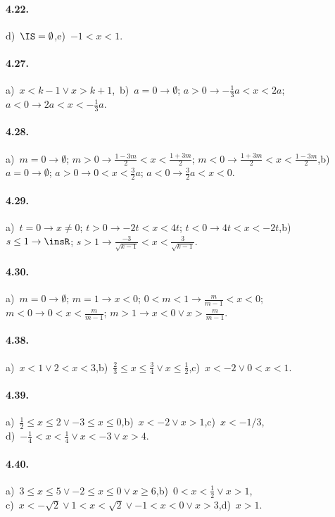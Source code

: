 \paragraph{4.22.} d)~$\IS=\emptyset $,\quad e)~$-1<x<1$.

\paragraph{4.27.} a)~$x<k-1\vee x>k+1$,\, b)~$a=0\to \emptyset$; $a>0\to -\frac 1 3a<x<2a$; $a<0\to 2a<x<-\frac 1 3a$.

\paragraph{4.28.} a)~$m=0\to \emptyset$; $m>0\to \frac{1-3m}2<x<\frac{1+3m} 2$; $m<0\to \frac{1+3m} 2<x<\frac{1-3m} 2$,\quad b)~$a=0\to \emptyset$; $a>0\to 0<x<\frac 3 2a$; $a<0\to \frac 3 2a<x<0$.

\paragraph{4.29.} a)~$t=0\to x\neq 0$; $t>0\to -2t<x<4t$; $t<0\to 4t<x<-2t$,\quad b)~$s\le 1\to \insR$; $s>1\to \frac{-3}{\sqrt{k-1}}<x<\frac 3{\sqrt{k-1}}$.

\paragraph{4.30.} a)~$m=0\to \emptyset$; $m=1\to x<0$; $0<m<1\to \frac m{m-1}<x<0$; $m<0\to 0<x<\frac m{m-1}$; $m>1\to x<0\vee x>\frac m{m-1}$.

\paragraph{4.38.} a)~$x<1\vee 2<x<3$,\quad b)~$\frac 2 3\le x\le \frac 3 4\vee x\le \frac 1 2$,\quad c)~$x<-2\vee 0<x<1$.

\paragraph{4.39.} a)~$\frac 1 2\le x\le 2\vee -3\le x\le 0$,\quad b)~$x<-2\vee x>1$,\quad c)~$x<-1/3$,\protect\\
d)~$-\frac 1 4<x<\frac 1 4\vee x<-3\vee x>4$.

\paragraph{4.40.} a)~$3\le x\le 5\vee -2\le x\le 0\vee x\ge 6$,\quad b)~$0<x<\frac 1 2\vee x>1$,\protect\\
c)~$x<-\sqrt 2\vee 1<x<\sqrt 2\vee -1<x<0\vee x>3$,\quad d)~$x>1$.


